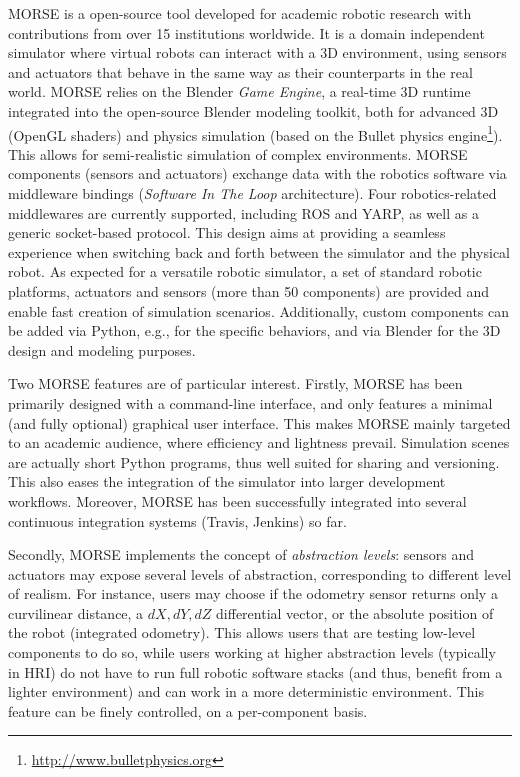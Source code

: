 \documentclass[conference]{IEEEtran}
\begin{document}
MORSE is a open-source tool developed for academic robotic research with
contributions from over 15 institutions worldwide. It is a domain independent
simulator where virtual robots can interact with a 3D environment, using sensors
and actuators that behave in the same way as their counterparts in the real
world. MORSE relies on the Blender \emph{Game Engine}, a real-time 3D runtime
integrated into the open-source Blender modeling toolkit, both for advanced 3D
(OpenGL shaders) and physics simulation (based on the {\sc Bullet} physics
engine\footnote{\url{http://www.bulletphysics.org}}). This allows for
semi-realistic simulation of complex environments. MORSE components (sensors
and actuators) exchange data with the robotics software via middleware bindings
(\emph{Software In The Loop} architecture). Four robotics-related middlewares are
currently supported, including ROS and YARP, as well as a generic socket-based
protocol. This design aims at providing a seamless experience when switching
back and forth between the simulator and the physical robot. As expected for a
versatile robotic simulator, a set of standard robotic platforms, actuators and
sensors (more than 50 components) are provided and enable fast creation of
simulation scenarios. Additionally, custom components can be added via Python, e.g.,
for the specific behaviors, and via Blender for the 3D design and modeling purposes.

Two MORSE features are of particular interest. Firstly, MORSE has been primarily
designed with a command-line interface, and only features a minimal (and fully
optional) graphical user interface. This makes MORSE mainly targeted to an
academic audience, where efficiency and lightness prevail. Simulation scenes are
actually short Python programs, thus well suited for sharing and versioning.
This also eases the integration of the simulator into larger development
workflows. Moreover, MORSE has been successfully integrated into several continuous
integration systems (Travis, Jenkins) so far.

Secondly, MORSE implements the concept of \emph{abstraction levels}: sensors and actuators
may expose several levels of abstraction, corresponding to different level of
realism. For instance, users may choose if the odometry sensor returns only a
curvilinear distance, a $dX, dY, dZ$ differential vector, or the absolute
position of the robot (integrated odometry). This allows users that are testing
low-level components to do so, while users working at higher abstraction
levels (typically in HRI) do not have to run full robotic software stacks (and
thus, benefit from a lighter environment) and can work in a more deterministic
environment. This feature can be finely controlled, on a per-component basis.
\end{document}
